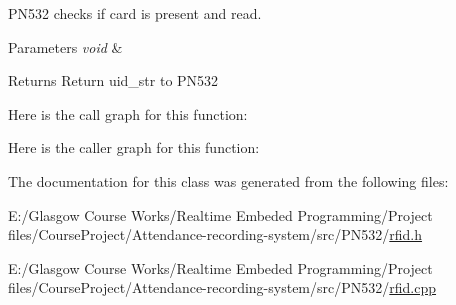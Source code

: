 P\+N532 checks if card is present and read. 


\begin{DoxyParams}{Parameters}
{\em void} & \\
\hline
\end{DoxyParams}
\begin{DoxyReturn}{Returns}
Return uid\+\_\+str to P\+N532 
\end{DoxyReturn}


Here is the call graph for this function\+:




Here is the caller graph for this function\+:




The documentation for this class was generated from the following files\+:\begin{DoxyCompactItemize}
\item 
E\+:/\+Glasgow Course Works/\+Realtime Embeded Programming/\+Project files/\+Course\+Project/\+Attendance-\/recording-\/system/src/\+P\+N532/\hyperlink{rfid_8h}{rfid.\+h}\item 
E\+:/\+Glasgow Course Works/\+Realtime Embeded Programming/\+Project files/\+Course\+Project/\+Attendance-\/recording-\/system/src/\+P\+N532/\hyperlink{rfid_8cpp}{rfid.\+cpp}\end{DoxyCompactItemize}
